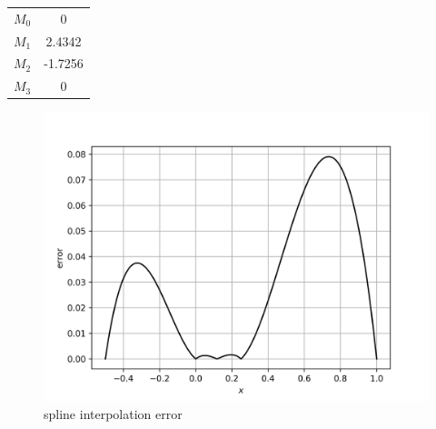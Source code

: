 \documentclass[12,a4paper]{article}
\begin{document}
     \begin{table}[H]
       \centering
       \begin{tabular}{|c|c|}
       \hline
        $M_0$ & 0 \\
        $M_1$ & 2.4342\\
        $M_2$ & -1.7256\\
        $M_3$ & 0\\
        \hline
       \end{tabular}
   \end{table}
   
    \begin{figure}[H]
        \centering
        \includegraphics[width=\textwidth]{plots/sq3c.png}
        \caption{spline interpolation error}
    \end{figure}
\end{document}
